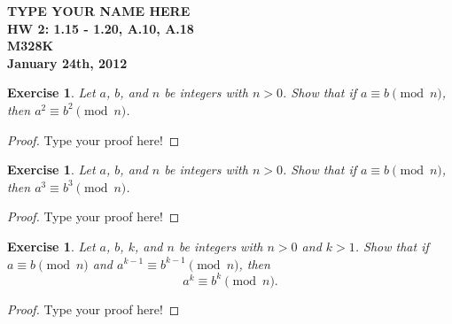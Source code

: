 \documentclass[12pt,leqno]{article}
\numberwithin{equation}{section}
\newtheorem{exer}[thm]{Exercise}
\theoremstyle{definition}
\begin{document}
\thispagestyle{plain}
\begin{flushright}
\large{\textbf{TYPE YOUR NAME HERE \\
HW 2: 1.15 - 1.20, A.10, A.18\\
M328K \\
January 24th, 2012 \\}}
\end{flushright}

\markboth{}{} \setcounter{section}{0} \baselineskip=18pt

\setcounter{tocdepth}{4}



\setcounter{section}{1}

\setcounter{thm}{14}

\begin{exer}
Let $a$, $b$, and $n$ be integers with $n
> 0$.  Show that if $a \equiv b \pmod{n}$,
then $a^2 \equiv b^2 \pmod{n}$.
\end{exer}

\begin{proof}[Proof]
Type your proof here!
\end{proof}

\begin{exer}
Let $a$, $b$, and $n$ be integers with $n
> 0$.  Show that if $a \equiv b \pmod{n}$,
then $a^3 \equiv b^3 \pmod{n}$.
\end{exer}

\begin{proof}[Proof]
Type your proof here!
\end{proof}

\begin{exer}
Let $a$, $b$, $k$, and $n$ be integers with $n
> 0$ and $k > 1$. Show that if $a \equiv b \pmod{n}$ and
$a^{k-1} \equiv b^{k-1} \pmod{n}$,
then \[a^k \equiv b^k \pmod{n}.\]
\end{exer}

\begin{proof}[Proof]
Type your proof here!
\end{proof}
\end{document}
